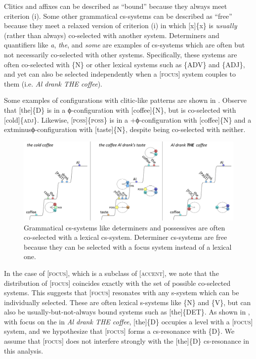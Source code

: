   Clitics and affixes can be described as “bound” because they always meet criterion (i). Some other grammatical cs-systems can be described as “free” because they meet a relaxed version of criterion (i) in which [x]\{x\} is \textit{usually} (rather than always) co-selected with another system. Determiners and quantifiers like \textit{a}, \textit{the}, and \textit{some} are examples of cs-systems which are often but not necessarily co-selected with other systems. Specifically, these systems are often co-selected with \{N\} or other lexical systems such as \{A\textsc{DV}\} and \{A\textsc{DJ}\}, and yet can also be selected independently when a [\textsc{focus}] system couples to them (i.e. \textit{Al drank THE coffee}).

  Some examples of configurations with clitic-like patterns are shown in {}. Observe that [the]\{\textsc{D}\} is in a ϕ-configuration with [coffee]\{N\}, but is co-selected with [cold]\{\textsc{adj}\}. Likewise, [\textsc{poss}]\{\textsc{poss}\} is in a +ϕ-configuration with [coffee]\{N\} and a 	extminus{}ϕ-configuration with [taste]\{N\}, despite being co-selected with neither. 

  
\begin{figure}
\includegraphics[width=\textwidth]{figures/Tilsen-img68.png}
\caption{Grammatical cs-systems like determiners and possessives are often co-selected with a lexical cs-system. Determiner cs-systems are free because they can be selected with a focus system instead of a lexical one.}
\label{fig:4:18}
\end{figure}
 

  In the case of [\textsc{focus}], which is a subclass of [\textsc{accent}], we note that the distribution of [\textsc{focus}] coincides exactly with the set of possible co-selected systems. This suggests that [\textsc{focus}] resonates with any s-system which can be individually selected. These are often lexical s-systems like \{N\} and \{V\}, but can also be usually-but-not-always bound systems such as [the]\{DET\}. As shown in {}, with focus on the  in \textit{Al drank THE coffee}, [the]\{D\} occupies a level with a [\textsc{focus}] system, and we hypothesize that [\textsc{focus}] forms a cs-resonance with \{D\}. We assume that [\textsc{focus}] does not interfere strongly with the [the]\{D\} cs-resonance in this analysis.

